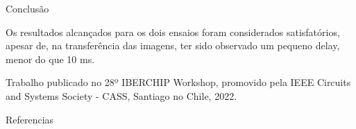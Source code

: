 \documentclass[10pt]{beamer}
\begin{document}
\begin{frame}{Conclusão}
	\begin{alertblock}{}
		\vspace{0.2cm}
		\begin{justify}
			Os resultados alcançados para os dois ensaios foram considerados satisfatórios, apesar de, na transferência das imagens, ter sido observado um pequeno delay, menor do que 10 ms.
		\end{justify}
		\vspace{1cm}
		{\small Trabalho publicado no 28º IBERCHIP Workshop, promovido pela IEEE Circuits and Systems Society - CASS, Santiago no Chile, 2022.}
	\end{alertblock}
\end{frame}








\begin{frame}[allowframebreaks]{Referencias}
  
  
\end{frame}
\end{document}
